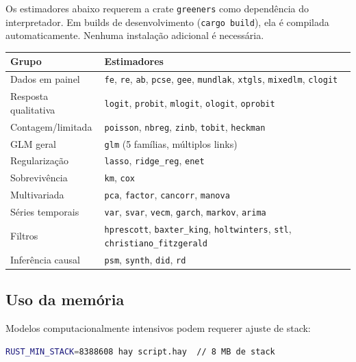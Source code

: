 Os estimadores abaixo requerem a crate \texttt{greeners} como dependência
do interpretador. Em builds de desenvolvimento (\texttt{cargo build}), ela é
compilada automaticamente. Nenhuma instalação adicional é necessária.

\begin{center}
\begin{tabular}{ll}
\toprule
\textbf{Grupo} & \textbf{Estimadores} \\
\midrule
Dados em painel    & \texttt{fe}, \texttt{re}, \texttt{ab}, \texttt{pcse}, \texttt{gee},
                     \texttt{mundlak}, \texttt{xtgls}, \texttt{mixedlm}, \texttt{clogit} \\
Resposta qualitativa & \texttt{logit}, \texttt{probit}, \texttt{mlogit},
                       \texttt{ologit}, \texttt{oprobit} \\
Contagem/limitada  & \texttt{poisson}, \texttt{nbreg}, \texttt{zinb},
                     \texttt{tobit}, \texttt{heckman} \\
GLM geral          & \texttt{glm} (5 famílias, múltiplos links) \\
Regularização      & \texttt{lasso}, \texttt{ridge\_reg}, \texttt{enet} \\
Sobrevivência      & \texttt{km}, \texttt{cox} \\
Multivariada       & \texttt{pca}, \texttt{factor}, \texttt{cancorr}, \texttt{manova} \\
Séries temporais   & \texttt{var}, \texttt{svar}, \texttt{vecm}, \texttt{garch},
                     \texttt{markov}, \texttt{arima} \\
Filtros            & \texttt{hprescott}, \texttt{baxter\_king}, \texttt{holtwinters},
                     \texttt{stl}, \texttt{christiano\_fitzgerald} \\
Inferência causal  & \texttt{psm}, \texttt{synth}, \texttt{did}, \texttt{rd} \\
\bottomrule
\end{tabular}
\end{center}

\subsection*{Uso da memória}

Modelos computacionalmente intensivos podem requerer ajuste de stack:

\begin{lstlisting}[style=inline, language=sh]
RUST_MIN_STACK=8388608 hay script.hay  // 8 MB de stack
\end{lstlisting}

